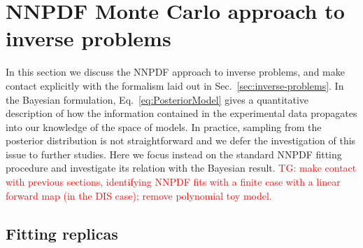 \section{NNPDF Monte Carlo approach to inverse problems}
\label{sec:closure-test}

In this section we discuss the NNPDF approach to inverse problems, and make
contact explicitly with the formalism laid out in
Sec.~\ref{sec:inverse-problems}. In the Bayesian formulation,
Eq.~\eqref{eq:PosteriorModel} gives a quantitative description of how the
information contained in the experimental data propagates into our knowledge of
the space of models. In practice, sampling from the posterior distribution is
not straightforward and we defer the investigation of this issue to further
studies. Here we focus instead on the standard NNPDF fitting procedure and
investigate its relation with the Bayesian result. 
\textcolor{red}{TG: make contact with previous sections, identifying NNPDF fits with 
a finite case with a linear forward map (in the DIS case); remove polynomial toy model.}

\subsection{Fitting replicas}
\label{sec:fit-reps}


